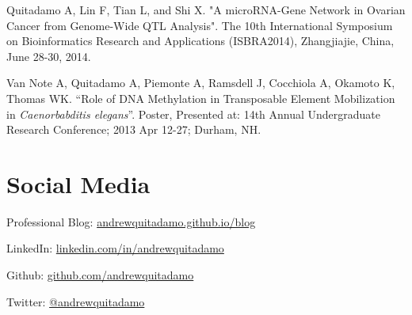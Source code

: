 \documentclass[margin,line]{res}
\begin{document}
\begin{resume}
Quitadamo A, Lin F, Tian L, and Shi X. "A microRNA-Gene Network in Ovarian Cancer from Genome-Wide QTL Analysis". The 10th International Symposium on Bioinformatics Research and Applications (ISBRA2014), Zhangjiajie, China, June 28-30, 2014.

Van Note A, Quitadamo A, Piemonte A, Ramsdell J, Cocchiola A, Okamoto K, Thomas WK. “Role of DNA Methylation in Transposable Element Mobilization in {\em Caenorbabditis elegans}”. Poster, Presented at: 14th Annual Undergraduate Research Conference; 2013 Apr 12-27; Durham, NH.

\section{\sc Social Media}

Professional Blog: \href{https://andrewquitadamo.github.io/blog}{andrewquitadamo.github.io/blog}

LinkedIn: \href{http://linkedin.com/in/andrewquitadamo}{linkedin.com/in/andrewquitadamo}

Github: \href{https://github.com/andrewquitadamo}{github.com/andrewquitadamo}

Twitter: \href{https://twitter.com/andrewquitadamo}{@andrewquitadamo}

\end{resume}
\end{document}
